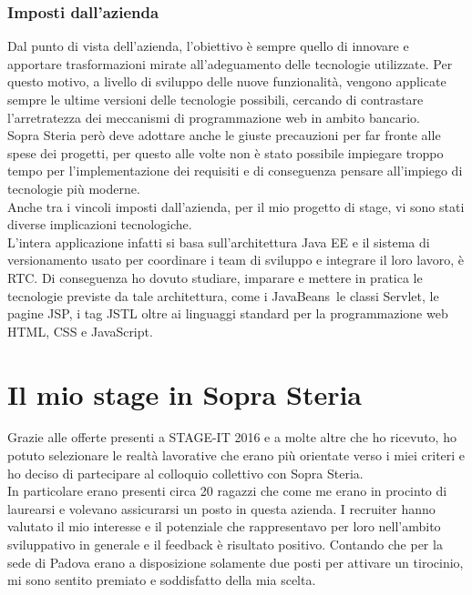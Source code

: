 	\subsubsection{Imposti dall'azienda}	
	Dal punto di vista dell'azienda, l'obiettivo è sempre quello di innovare e apportare trasformazioni mirate all'adeguamento delle tecnologie utilizzate. Per questo motivo, a livello di sviluppo delle nuove funzionalità, vengono applicate sempre le ultime versioni delle tecnologie possibili, cercando di contrastare l'arretratezza dei meccanismi di programmazione web in ambito bancario.\\
	
	Sopra Steria però deve adottare anche le giuste precauzioni per far fronte alle spese dei progetti, per questo alle volte non è stato possibile impiegare troppo tempo per l'implementazione dei requisiti e di conseguenza pensare all'impiego di tecnologie più moderne.\\
	
	Anche tra i vincoli imposti dall'azienda, per il mio progetto di stage, vi sono stati diverse implicazioni tecnologiche.\\
	
	L'intera applicazione infatti si basa sull'architettura Java EE e il sistema di versionamento usato per coordinare i team di sviluppo e integrare il loro lavoro, è RTC. Di conseguenza ho dovuto studiare, imparare e mettere in pratica le tecnologie previste da tale architettura, come i JavaBeans\glossario\, le classi Servlet\glossario , le pagine JSP, i tag JSTL oltre ai linguaggi standard per la programmazione web HTML, CSS e JavaScript.

\section{Il mio stage in Sopra Steria}

Grazie alle offerte presenti a STAGE-IT 2016 e a molte altre che ho ricevuto, ho potuto selezionare le realtà lavorative che erano più orientate verso i miei criteri e ho deciso di partecipare al colloquio collettivo con Sopra Steria.\\

In particolare erano presenti circa 20 ragazzi che come me erano in procinto di laurearsi e volevano assicurarsi un posto in questa azienda. I recruiter hanno valutato il mio interesse e il potenziale che rappresentavo per loro nell'ambito sviluppativo in generale e il feedback è risultato positivo. Contando che per la sede di Padova erano a disposizione solamente due posti per attivare un tirocinio, mi sono sentito premiato e soddisfatto della mia scelta.\\

